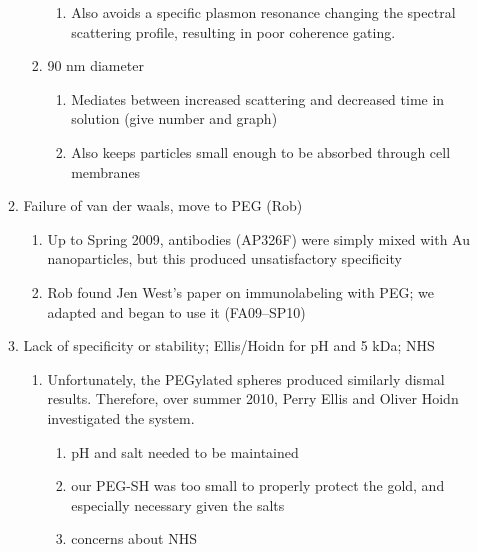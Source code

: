 \begin{enumerate}
\begin{enumerate}
\begin{enumerate}
\begin{enumerate}
\item Also avoids a specific plasmon resonance changing the spectral scattering profile, resulting in poor coherence gating.

\end{enumerate}

\item 90 nm diameter

\begin{enumerate}
\item Mediates between increased scattering and decreased time in solution (give number and graph)

\item Also keeps particles small enough to be absorbed through cell membranes

\end{enumerate}

\end{enumerate}

\item Failure of van der waals, move to PEG (Rob)

\begin{enumerate}
\item Up to Spring 2009, antibodies (AP326F) were simply mixed with Au nanoparticles, but this produced unsatisfactory specificity

\item Rob found Jen West's paper on immunolabeling with PEG; we adapted and began to use it (FA09--SP10)

\end{enumerate}

\item Lack of specificity or stability; Ellis\slash Hoidn for pH and 5 kDa; NHS

\begin{enumerate}
\item Unfortunately, the PEGylated spheres produced similarly dismal results. Therefore, over summer 2010, Perry Ellis and Oliver Hoidn investigated the system.

\begin{enumerate}
\item pH and salt needed to be maintained

\item our PEG-SH was too small to properly protect the gold, and especially necessary given the salts

\item concerns about NHS


\end{enumerate}
\end{enumerate}
\end{enumerate}
\end{enumerate}
